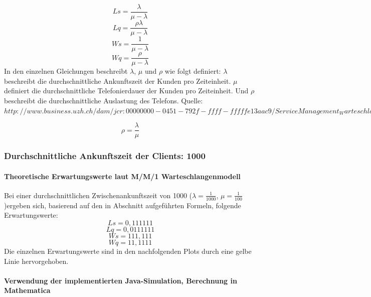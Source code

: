 \begin{equation}
Ls=\frac{\lambda}{\mu - \lambda}
\end{equation}
\begin{equation}
Lq=\frac{\rho\lambda}{\mu - \lambda}
\end{equation}
\begin{equation}
Ws=\frac{1}{\mu - \lambda}
\end{equation}
\begin{equation}
Wq=\frac{\rho}{\mu - \lambda}
\end{equation}
In den einzelnen Gleichungen beschreibt $\lambda$, $\mu$ und $\rho$ wie folgt definiert: $\lambda$ beschreibt die durchschnittliche Ankunftszeit der Kunden pro Zeiteinheit. $\mu$ definiert die durchschnittliche Telefonierdauer der Kunden pro Zeiteinheit. Und $\rho$ beschreibt die durchschnittliche Auslastung des Telefons. Quelle: $http://www.business.uzh.ch/dam/jcr:00000000-0451-792f-ffff-fffffe13aac9/ServiceManagement_Warteschlangenmodelle.pdf$

\begin{equation}
\rho=\frac{\lambda}{\mu}
\end{equation}

\subsubsection{Durchschnittliche Ankunftszeit der Clients: 1000}
\paragraph{Theoretische Erwartungswerte laut M/M/1 Warteschlangenmodell}
Bei einer durchschnittlichen Zwischenankunftszeit von 1000 ($\lambda=\frac{1}{1000}$, $\mu=\frac{1}{100}$)ergeben sich, basierend auf den in Abschnitt \label{Formeln} aufgeführten Formeln, folgende Erwartungswerte:
\begin{equation}
Ls=0,111111
\end{equation}
\begin{equation}
Lq=0,0111111
\end{equation}
\begin{equation}
Ws=111,111
\end{equation}
\begin{equation}
Wq=11,1111
\end{equation}
Die einzelnen Erwartungswerte sind in den nachfolgenden Plots durch eine gelbe Linie hervorgehoben.
\paragraph{Verwendung der implementierten Java-Simulation, Berechnung in Mathematica}

